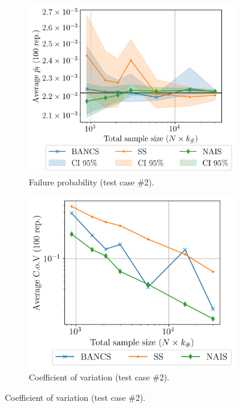 \begin{figure}
    \centering
    \begin{subfigure}[b]{0.49\linewidth}
        \centering
        \includegraphics[width=\linewidth]{part3/figures/BANCS/RP4B_mean.png}
        \caption{Failure probability (test case \#2).}
    \end{subfigure}
    \begin{subfigure}[b]{0.47\linewidth}
        \centering
        \includegraphics[width=\linewidth]{part3/figures/BANCS/RP4B_cov.png}
        \caption{Coefficient of variation (test case \#2).}

\end{subfigure}
\end{figure}
